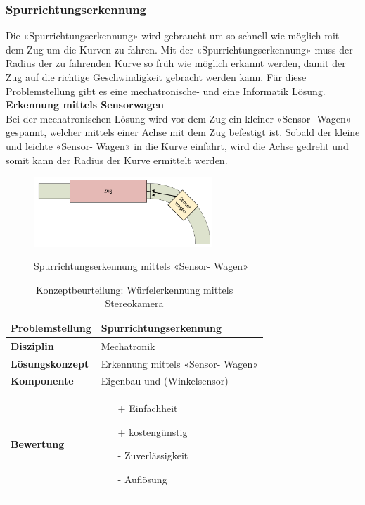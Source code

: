 \documentclass[../../main.tex]{subfiles}
\begin{document}
    \subsubsection{Spurrichtungserkennung}
	Die «Spurrichtungserkennung» wird gebraucht um so schnell wie möglich mit dem Zug um die Kurven zu fahren. Mit der «Spurrichtungserkennung» muss der Radius der zu fahrenden Kurve so früh wie möglich erkannt werden, damit der Zug auf die richtige Geschwindigkeit gebracht werden kann. Für diese Problemstellung gibt es eine mechatronische- und eine Informatik Lösung.\\

    \textbf{Erkennung mittels Sensorwagen}\\
    Bei der mechatronischen Lösung wird vor dem Zug ein kleiner «Sensor- Wagen» gespannt, welcher mittels einer Achse
    mit dem Zug befestigt ist. Sobald der kleine und leichte «Sensor- Wagen» in die Kurve einfahrt, wird die Achse gedreht
    und somit kann der Radius der Kurve ermittelt werden.\\
    \begin{figure}[H] %
        \centering
        \includegraphics[width=0.6\textwidth]{spurrichtung_mechatronik.png}
        \label{fig:obj_spurrichtung}
        \caption{Spurrichtungserkennung mittels «Sensor- Wagen»}
    \end{figure}

    \begin{flushleft}
        \begin{table}[H]
        \begin{tabular}{ | l | p{11cm} |}
        \hline
        \textbf{Problemstellung} & Spurrichtungserkennung \\ \hline
        \textbf{Disziplin} & Mechatronik \\ \hline
        \textbf{Lösungskonzept} & Erkennung mittels «Sensor- Wagen» \\ \hline
        \textbf{Komponente} & Eigenbau und (Winkelsensor) \\ \hline
        \textbf{Bewertung} &  \begin{itemize}
                                \item[+] Einfachheit
                                \item[+] kostengünstig
                                \item[-] Zuverlässigkeit
                                \item[-] Auflösung   
                              \end{itemize} \\ \hline
        \end{tabular}
        \caption{Konzeptbeurteilung: Würfelerkennung mittels Stereokamera}
        \label{tab:konzept_wurfel_Stereokamera}
    \end{table}
    \end{flushleft}
\end{document}
